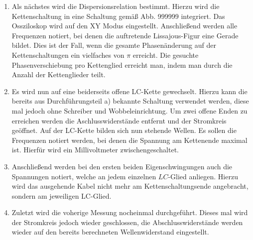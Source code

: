 \begin{enumerate}
\item Als nächstes wird die Dispersionsrelation bestimmt. Hierzu wird die
 Kettenschaltung in eine Schaltung gemäß Abb. 999999 integriert. Das Ossziloskop
  wird auf den XY Modus eingestellt. Anschließend werden alle Frequenzen notiert,
    bei denen die auftretende Lissajous-Figur eine Gerade bildet. Dies ist der
     Fall, wenn die gesamte Phasenänderung auf der Kettenschaltungen ein
      vielfaches von $\pi$ erreicht. Die gesuchte Phasenverschiebung pro Kettenglied
        erreicht man, indem man durch die Anzahl der Kettenglieder teilt.

\item Es wird nun auf eine beiderseits offene LC-Kette gewechselt. Hierzu kann
 die bereits aus Durchführungsteil a) bekannte Schaltung verwendet werden,
  diese mal jedoch ohne Schreiber und Wobbeleinrichtung. Um zwei offene Enden zu
   erreichen werden die Aschlusswiderstände entfernt und der Stromkreis geöffnet.
    Auf der LC-Kette bilden sich nun stehende Wellen. Es
   sollen die Frequenzen notiert werden, bei denen die Spannung am Kettenende
    maximal ist. Hierfür wird ein Millivoltmeter zwischengeschaltet.

\item Anschließend werden bei den ersten beiden Eigenschwingungen auch die
 Spannungen notiert, welche an jedem einzelnen $LC$-Glied anliegen. Hierzu wird
  das ausgehende Kabel nicht mehr am Kettenschaltungsende angebracht, sondern
   am jeweiligen LC-Glied.

   \item Zuletzt wird die voherige Messung nocheinmal durchgeführt. Dieses mal
    wird der Stromkreis jedoch wieder geschlossen, die Abschlusswiderstände werden
     wieder auf den bereits berechneten Wellenwiderstand eingestellt. 


\end{enumerate}
